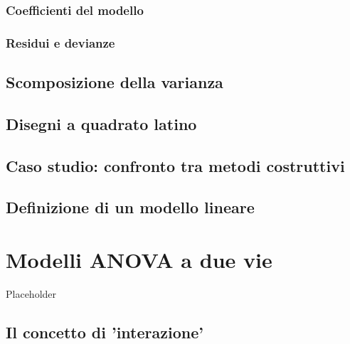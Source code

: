 \documentclass[a4paper,12pt,oneside]{book}
\begin{document}
\hypertarget{coefficienti-del-modello-1}{%
\subsection{Coefficienti del modello}\label{coefficienti-del-modello-1}}

\hypertarget{residui-e-devianze}{%
\subsection{Residui e devianze}\label{residui-e-devianze}}

\hypertarget{scomposizione-della-varianza-1}{%
\section{Scomposizione della varianza}\label{scomposizione-della-varianza-1}}

\hypertarget{disegni-a-quadrato-latino-1}{%
\section{Disegni a quadrato latino}\label{disegni-a-quadrato-latino-1}}

\hypertarget{caso-studio-confronto-tra-metodi-costruttivi}{%
\section{Caso studio: confronto tra metodi costruttivi}\label{caso-studio-confronto-tra-metodi-costruttivi}}

\hypertarget{definizione-di-un-modello-lineare-2}{%
\section{Definizione di un modello lineare}\label{definizione-di-un-modello-lineare-2}}

\hypertarget{modelli-anova-a-due-vie}{%
\chapter{Modelli ANOVA a due vie}\label{modelli-anova-a-due-vie}}

Placeholder

\hypertarget{il-concetto-di-interazione}{%
\section{Il concetto di 'interazione'}\label{il-concetto-di-interazione}}
\end{document}
